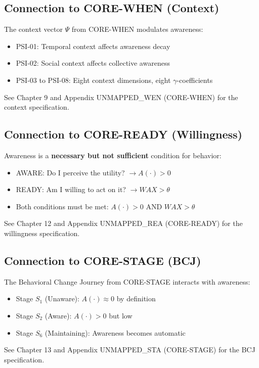 \subsection{Connection to CORE-WHEN (Context)}

\begin{cross-reference}
The context vector $\Psi$ from CORE-WHEN modulates awareness:
\begin{itemize}[nosep]
  \item PSI-01: Temporal context affects awareness decay
  \item PSI-02: Social context affects collective awareness
  \item PSI-03 to PSI-08: Eight context dimensions, eight $\gamma$-coefficients
\end{itemize}
See Chapter 9 and Appendix UNMAPPED_WEN (CORE-WHEN) for the context specification.
\end{cross-reference}

\subsection{Connection to CORE-READY (Willingness)}

\begin{cross-reference}
Awareness is a \textbf{necessary but not sufficient} condition for behavior:
\begin{itemize}[nosep]
  \item AWARE: Do I perceive the utility? $\rightarrow A(\cdot) > 0$
  \item READY: Am I willing to act on it? $\rightarrow WAX > \theta$
  \item Both conditions must be met: $A(\cdot) > 0$ AND $WAX > \theta$
\end{itemize}
See Chapter 12 and Appendix UNMAPPED_REA (CORE-READY) for the willingness specification.
\end{cross-reference}

\subsection{Connection to CORE-STAGE (BCJ)}

\begin{cross-reference}
The Behavioral Change Journey from CORE-STAGE interacts with awareness:
\begin{itemize}[nosep]
  \item Stage $S_1$ (Unaware): $A(\cdot) \approx 0$ by definition
  \item Stage $S_2$ (Aware): $A(\cdot) > 0$ but low
  \item Stage $S_6$ (Maintaining): Awareness becomes automatic
\end{itemize}
See Chapter 13 and Appendix UNMAPPED_STA (CORE-STAGE) for the BCJ specification.
\end{cross-reference}

